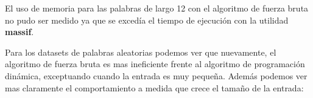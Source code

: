 \begin{enumerate}
    \begin{mdframed}
        El uso de memoria para las palabras de largo 12 con el algoritmo de 
        fuerza bruta no pudo ser medido ya que 
        se excedía el tiempo de ejecución con la utilidad \textbf{massif}.
    \end{mdframed}

    Para los datasets de palabras aleatorias podemos ver que nuevamente,
    el algoritmo de fuerza bruta es mas ineficiente frente al algoritmo
    de programación dinámica, exceptuando cuando la entrada es muy pequeña.
    Además podemos ver mas claramente el comportamiento a medida que crece el 
    tamaño de la entrada:


    \begin{figure}[H]
        \centering
      

    \end{figure}

    \begin{figure}[H]
        \centering
      

\end{figure}
\end{enumerate}
